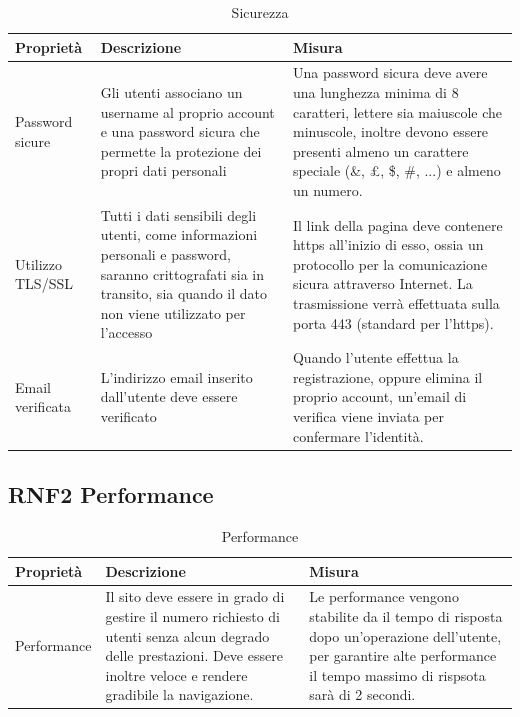 \documentclass[a4paper,12pt]{article}
\begin{document}
\begin{table}[H]
    \centering
    \begin{tabular}{|p{}|p{}|p{}|}
    

        \hline 
         Proprietà & Descrizione & Misura\\
         \hline      
         
         Password sicure&  Gli utenti associano un username al proprio account e una password sicura che permette la protezione dei propri dati personali& Una password sicura deve avere una lunghezza minima di 8 caratteri, lettere sia maiuscole che minuscole, inoltre devono essere presenti almeno un carattere speciale (\&, £, \$, \#, ...) e almeno un numero.\\ \hline
        Utilizzo TLS/SSL & Tutti i dati sensibili degli utenti, come informazioni personali e password, saranno crittografati sia in transito, sia quando il dato non viene utilizzato
        per l’accesso & Il link della pagina deve contenere https all'inizio di esso, ossia un protocollo per la comunicazione sicura attraverso Internet. La trasmissione verrà effettuata sulla porta 443 (standard per l'https). \\  \hline
        Email verificata & L’indirizzo email inserito dall’utente deve essere verificato &
        Quando l'utente effettua la registrazione, oppure elimina il proprio account, un'email di verifica viene inviata per confermare l'identità.
        \\ \hline
    \end{tabular}

    \caption{Sicurezza}
\end{table}

\subsection*{RNF2 Performance}

\begin{table}[H]
    \centering
    \begin{tabular}{|>{\centering}p{}|p{}|p{}|}
        \hline  
         Proprietà & Descrizione & Misura\\
         \hline      
         Performance  
         &Il sito deve essere in grado di gestire il numero richiesto di utenti senza alcun degrado delle prestazioni. Deve essere inoltre veloce e rendere gradibile la navigazione.
         &  Le performance vengono stabilite da il tempo di risposta dopo un’operazione dell’utente, per garantire alte performance il tempo massimo di rispsota sarà di 2 secondi.\\ \hline
    \end{tabular}
    \caption{Performance}
    
\end{table}
\end{document}
